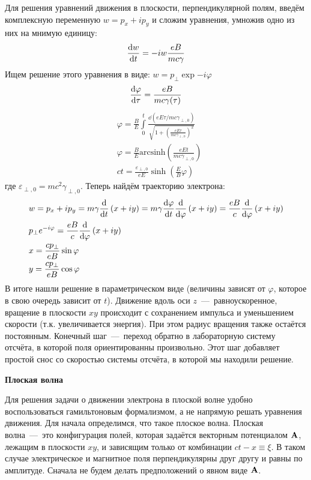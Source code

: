 \documentclass[10pt, a4paper]{article}
\begin{document}
Для решения уравнений движения в плоскости, перпендикулярной полям, введём комплексную переменную $w = p_x + i p_y$ и сложим уравнения, умножив одно из них на мнимую единицу:
\begin{equation*}
	\dv{w}{t} = -i w \frac{eB}{mc\gamma}
\end{equation*}
Ищем решение этого уравнения в виде: $w = p_\perp\exp{-i\varphi}$
\begin{equation*}
	\dv{\varphi}{\tau} = \frac{eB}{mc\gamma(\tau)}
\end{equation*}
\begin{align*}
	&\varphi = \frac{B}{E}\int\limits_0^{t}\frac{\dd \left(eE\tau / mc\gamma_{\perp,0}\right)}{\sqrt{1 + \left( \frac{eE\tau}{mc\gamma_{\perp,0}} \right)^2}}\\
	&\varphi = \frac{B}{E}\text{arcsinh}\left( \frac{eEt}{mc\gamma_{\perp,0}} \right)\\
	&ct = \frac{\varepsilon_{\perp,0}}{eE}\sinh{\left( \frac{E}{B}\varphi \right)}
\end{align*}
где $\varepsilon_{\perp,0}=mc^2\gamma_{\perp,0}$. Теперь найдём траекторию электрона:
\begin{align*}
	&w = p_x + ip_y = m\gamma \dv{}{t}\left( x + iy \right) = m\gamma\dv{\varphi}{t}\dv{}{\varphi}\left( x + iy \right) = \frac{eB}{c}\dv{}{\varphi}\left( x + iy \right)\\
	&p_\perp e^{-i\varphi} = \frac{eB}{c}\dv{}{\varphi}\left( x + iy \right) \\
	&x = \frac{cp_\perp}{eB}\sin\varphi\\
	&y = \frac{cp_\perp}{eB}\cos\varphi\\
\end{align*}
В итоге нашли решение в параметрическом виде (величины зависят от $\varphi$, которое в свою очередь зависит от $t$). Движение вдоль оси $z$~---~равноускоренное, вращение в плоскости $xy$ происходит с сохранением импульса и уменьшением скорости (т.к. увеличивается энергия). При этом радиус вращения также остаётся постоянным. Конечный шаг~---~переход обратно в лабораторную систему отсчёта, в которой поля ориентированны произвольно. Этот шаг добавляет простой снос со скоростью системы отсчёта, в которой мы находили решение.

\vspace{5mm}
\textbf{Плоская волна}

Для решения задачи о движении электрона в плоской волне удобно воспользоваться гамильтоновым формализмом, а не напрямую решать уравнения движения. Для начала определимся, что такое плоское волна. Плоская волна~---~это конфигурация полей, которая задаётся векторным потенциалом $\vb{A}$, лежащим в плоскости $xy$, и зависящим только от комбинации $ct - x \equiv \xi$. В таком случае электрическое и магнитное поля перпендикулярны друг другу и равны по амплитуде. Сначала не будем делать предположений о явном виде $\vb{A}$.
\end{document}
